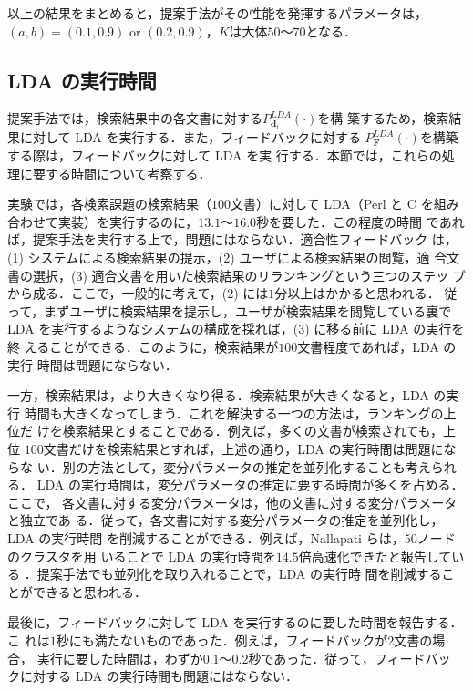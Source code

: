\documentclass[japanese]{jnlp_1.4}
\begin{document}
以上の結果をまとめると，提案手法がその性能を発揮するパラメータは，$(a,
b) = (0.1, 0.9)$ or $(0.2, 0.9)$，$K$は大体$50$〜$70$となる．



\subsection{LDA の実行時間} \label{ssec:computation_time}

提案手法では，検索結果中の各文書に対する$P^{LDA}_{\bm{d}_{i}}(\cdot)$を構
築するため，検索結果に対して LDA を実行する．また，フィードバックに対する
$P^{LDA}_{\bm{F}}(\cdot)$を構築する際は，フィードバックに対して LDA を実
行する．本節では，これらの処理に要する時間について考察する．

実験では，各検索課題の検索結果（$100$文書）に対して LDA（Perl と C を組み
合わせて実装）を実行するのに，$13.1$〜$16.0$秒を要した．この程度の時間
であれば，提案手法を実行する上で，問題にはならない．適合性フィードバック
は，(1) システムによる検索結果の提示，(2) ユーザによる検索結果の閲覧，適
合文書の選択，(3) 適合文書を用いた検索結果のリランキングという三つのステッ
プから成る．ここで，一般的に考えて，(2) には$1$分以上はかかると思われる．
従って，まずユーザに検索結果を提示し，ユーザが検索結果を閲覧している裏で
LDA を実行するようなシステムの構成を採れば，(3) に移る前に LDA の実行を終
えることができる．このように，検索結果が$100$文書程度であれば，LDA の実行
時間は問題にならない．

一方，検索結果は，より大きくなり得る．検索結果が大きくなると，LDA の実行
時間も大きくなってしまう．これを解決する一つの方法は，ランキングの上位だ
けを検索結果とすることである．例えば，多くの文書が検索されても，上位
$100$文書だけを検索結果とすれば，上述の通り，LDA の実行時間は問題にならな
い．別の方法として，変分パラメータの推定を並列化することも考えられる．
LDA の実行時間は，変分パラメータの推定に要する時間が多くを占める．ここで，
各文書に対する変分パラメータは，他の文書に対する変分パラメータと独立であ
る．従って，各文書に対する変分パラメータの推定を並列化し，LDA の実行時間
を削減することができる．例えば，Nallapati らは，$50$ノードのクラスタを用
いることで LDA の実行時間を$14.5$倍高速化できたと報告している
\cite{Nallapati2007}．提案手法でも並列化を取り入れることで，LDA の実行時
間を削減することができると思われる．

最後に，フィードバックに対して LDA を実行するのに要した時間を報告する．こ
れは$1$秒にも満たないものであった．例えば，フィードバックが$2$文書の場合，
実行に要した時間は，わずか$0.1$〜$0.2$秒であった．従って，フィードバッ
クに対する LDA の実行時間も問題にはならない．
\end{document}

